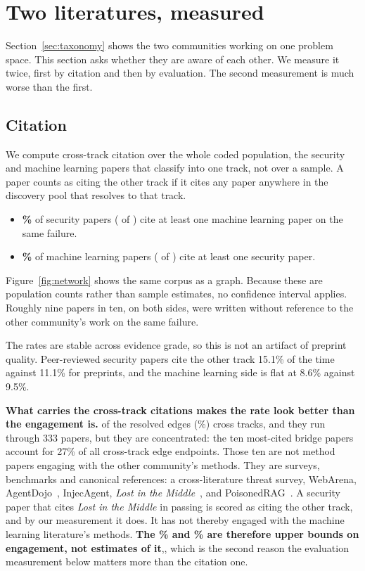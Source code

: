 \section{Two literatures, measured}
\label{sec:literatures}

Section~\ref{sec:taxonomy} shows the two communities working on one problem
space. This section asks whether they are aware of each other. We measure it
twice, first by citation and then by evaluation. The second measurement is much
worse than the first.

\subsection{Citation}

We compute cross-track citation over the whole coded population, the
\NTrackSecurity{} security and \NTrackML{} machine learning papers that
classify into one track, not over a sample. A
paper counts as citing the other track if it cites any paper anywhere in the
discovery pool that resolves to that track.

\begin{itemize}
\item \textbf{\PctSecCitesML{}\%} of security papers (\NSecCitesML{} of
  \NTrackSecurity{}) cite at least one machine
  learning paper on the same failure.
\item \textbf{\PctMLCitesSec{}\%} of machine learning papers (\NMLCitesSec{} of
  \NTrackML{}) cite at least one
  security paper.
\end{itemize}

Figure~\ref{fig:network} shows the same corpus as a graph. Because these are
population counts rather than sample estimates, no confidence interval
applies. Roughly nine papers in ten, on both sides, were written
without reference to the other community's work on the same failure.

The rates are stable across evidence grade, so this is not an artifact of
preprint quality. Peer-reviewed security papers cite the other track 15.1\% of
the time against 11.1\% for preprints, and the machine learning side is flat at
8.6\% against 9.5\%.

\textbf{What carries the cross-track citations makes the rate look better than
the engagement is.} \NNetworkCross{} of the \NNetworkEdges{} resolved edges
(\PctNetworkCross{}\%) cross tracks, and they run through 333 papers, but they are concentrated: the ten most-cited
bridge papers account for 27\% of all cross-track edge endpoints. Those ten are
not method papers engaging with the other community's methods. They are
surveys, benchmarks and canonical references: a cross-literature threat survey,
WebArena, AgentDojo~\cite{debenedetti-2024-agentdojo}, InjecAgent,
\emph{Lost in the Middle}~\cite{liu-2023-lost}, and
PoisonedRAG~\cite{zou-2024-poisonedrag}. A security paper that cites
\emph{Lost in the Middle} in passing is scored as citing the other track, and
by our measurement it does. It has not thereby engaged with the machine
learning literature's methods. \textbf{The \PctSecCitesML{}\% and \PctMLCitesSec{}\% are therefore upper bounds on engagement,
not estimates of it},, which is the second reason the
evaluation measurement below matters more than the citation one.


